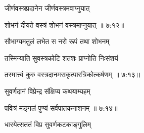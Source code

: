 {\devanagarifont जीर्णवस्त्रप्रदानेन जीर्णवस्त्रमवाप्नुयात्  \danda\dontdisplaylinenum }%
 

{\devanagarifont शोभनं दीयते वस्त्रं शोभनं वस्त्रमाप्नुयात् {॥ ७:१२॥} \veg\dontdisplaylinenum }%

\nemslokalong


\ujvers{}    %


\nemslokab

{\devanagarifont सौभाग्यमतुलं लभेत स नरो रूपं तथा शोभनम्  \danda\dontdisplaylinenum }%

\nemslokac

{\devanagarifont तस्मिन्याति सुवस्त्रकोटि शतशः प्राप्नोति निःसंशयं }%
  \dontdisplaylinenum    {}%



\nemslokad

{\devanagarifont तस्मात्त्वं कुरु वस्त्रदानमसकृत्पारत्रिकोत्कर्षणम् {॥ ७:१३॥} \veg\dontdisplaylinenum }%

\nemslokanormal




\vers


{\devanagarifont सुवर्णदानं विप्रेन्द्र संक्षिप्य कथयाम्यहम् \thinspace{\dandab} \dontdisplaylinenum }%


{\devanagarifont पवित्रं मङ्गलं पुण्यं सर्वपातकनाशनम् {॥ ७:१४॥} \veg\dontdisplaylinenum }%

{\devanagarifont धारयेत्सततं विप्र सुवर्णकटकाङ्गुलिम् \thinspace{\dandab} \dontdisplaylinenum }%

